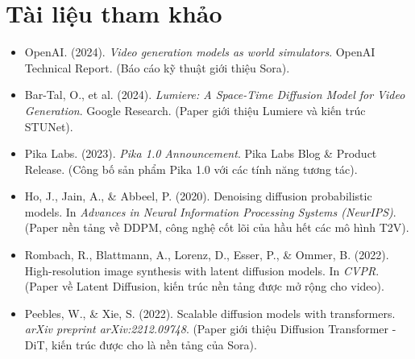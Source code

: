 \section*{Tài liệu tham khảo}
\begin{itemize}
	\item[1] OpenAI. (2024). \textit{Video generation models as world simulators}. OpenAI Technical Report. (Báo cáo kỹ thuật giới thiệu Sora).
	\item[2] Bar-Tal, O., et al. (2024). \textit{Lumiere: A Space-Time Diffusion Model for Video Generation}. Google Research. (Paper giới thiệu Lumiere và kiến trúc STUNet).
	\item[3] Pika Labs. (2023). \textit{Pika 1.0 Announcement}. Pika Labs Blog \& Product Release. (Công bố sản phẩm Pika 1.0 với các tính năng tương tác).
	\item[4] Ho, J., Jain, A., \& Abbeel, P. (2020). Denoising diffusion probabilistic models. In \textit{Advances in Neural Information Processing Systems (NeurIPS)}. (Paper nền tảng về DDPM, công nghệ cốt lõi của hầu hết các mô hình T2V).
	\item[5] Rombach, R., Blattmann, A., Lorenz, D., Esser, P., \& Ommer, B. (2022). High-resolution image synthesis with latent diffusion models. In \textit{CVPR}. (Paper về Latent Diffusion, kiến trúc nền tảng được mở rộng cho video).
	\item[6] Peebles, W., \& Xie, S. (2022). Scalable diffusion models with transformers. \textit{arXiv preprint arXiv:2212.09748}. (Paper giới thiệu Diffusion Transformer - DiT, kiến trúc được cho là nền tảng của Sora).
\end{itemize}